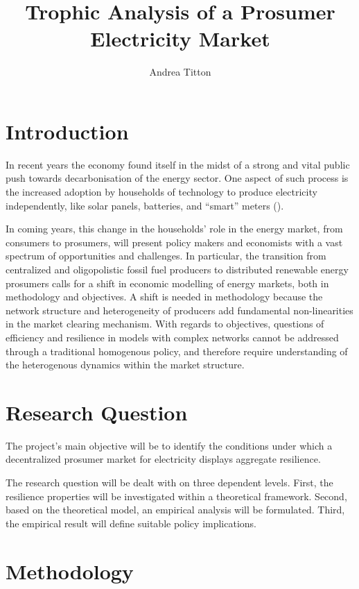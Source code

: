 \documentclass[american]{scrartcl}
\title{
        Trophic Analysis of a Prosumer Electricity Market
    }
\author{Andrea Titton}
\begin{document}
\nocite{*}
\maketitle

\section{Introduction}

In recent years the economy found itself in the midst of a strong and vital public push towards decarbonisation of the energy sector. One aspect of such process is the increased adoption by households of technology to produce electricity independently, like solar panels, batteries, and ``smart'' meters (\cite{Parag2016}).

In coming years, this change in the households' role in the energy market, from consumers to prosumers, will present policy makers and economists with a vast spectrum of opportunities and challenges. In particular, the transition from centralized and oligopolistic fossil fuel producers to distributed renewable energy prosumers calls for a shift in economic modelling of energy markets, both in methodology and objectives. A shift is needed in methodology because the network structure and heterogeneity of producers add fundamental non-linearities in the market clearing mechanism. With regards to objectives, questions of efficiency and resilience in models with complex networks cannot be addressed through a traditional homogenous policy, and therefore require understanding of the heterogenous dynamics within the market structure.

\section{Research Question}

The project's main objective will be to identify the conditions under which a decentralized prosumer market for electricity displays aggregate resilience.

The research question will be dealt with on three dependent levels. First, the resilience properties will be investigated within a theoretical framework. Second, based on the theoretical model, an empirical analysis will be formulated. Third, the empirical result will define suitable policy implications.

\section{Methodology}
\end{document}
